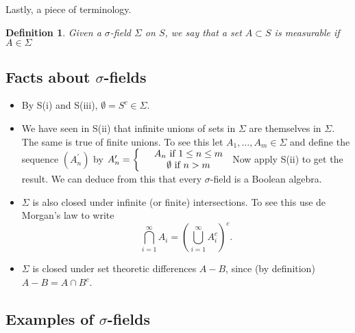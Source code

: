 \documentclass[a4paper]{report}
\newcounter{thm_counter}[chapter]
\newtheorem{defn}[thm_counter]{Definition}
\numberwithin{equation}{chapter}
\numberwithin{thm_counter}{section}
\begin{document}
Lastly, a piece of terminology.

\begin{defn}
Given a $\sigma$-field $\Sigma$ on $S$, we say that a set $A \subset S$ is {\it measurable} if $A \in \Sigma$
\end{defn}



\newpage
\subsection*{Facts about \(\sigma\)-fields}

\begin{itemize}

\item By S(i) and S(iii), $\emptyset = S^{c} \in \Sigma$.

\item We have seen in S(ii) that infinite unions of sets in
$\Sigma$ are themselves in $\Sigma$. The same is true of finite
unions. To see this let $A_{1}, \ldots, A_{m} \in \Sigma$ and define the sequence $(A_{n}^{\prime})$ by
$ A_{n}^{\prime}  = \left\{ \begin{array}{c c}  & A_{n} ~\mbox{if}~1 \leq n \leq m\\
 & \emptyset ~\mbox{if}~n > m \end{array} \right.$
 Now apply S(ii) to get the result. We can deduce from this that every $\sigma$-field is a Boolean algebra.


\item $\Sigma$ is also closed under infinite (or finite) intersections. To see
this use de Morgan's law to write
$$ \bigcap_{i=1}^{\infty} A_{i} = \left(\bigcup_{i=1}^{\infty} A_{i}^{c}\right)^{c}.$$

\item $\Sigma$ is closed under set theoretic differences $A-B$,
since (by definition) $A-B = A \cap B^{c}$.

\end{itemize}



\subsection*{Examples of \(\sigma\)-fields}
\end{document}
